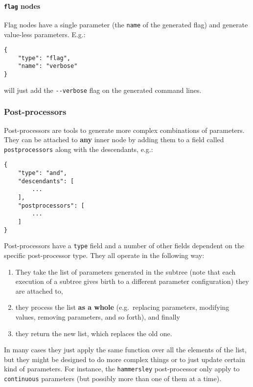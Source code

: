 \documentclass[11pt,notitlepage,twoside,a4paper]{article}
\begin{document}
\begin{footnotesize}
\paragraph{\texttt{flag} nodes}

Flag nodes have a single parameter (the \texttt{name} of the generated
flag) and generate value-less parameters. E.g.:

\begin{lstlisting}
{
    "type": "flag",
    "name": "verbose"
} 
\end{lstlisting}

\noindent
will just add the \texttt{-{}-verbose} flag on the generated command
lines.

\subsubsection{Post-processors}

Post-processors are tools to generate more complex combinations of
parameters. They can be attached to \textbf{any} inner node by adding
them to a field called \texttt{postprocessors} along with the
descendants, e.g.:

\begin{lstlisting}
{
    "type": "and",
    "descendants": [
        ...  
    ],
    "postprocessors": [
        ...
    ]
}
\end{lstlisting}

Post-processors have a \texttt{type} field and a number of other fields
dependent on the specific post-processor type. They all operate in the
following way:

\begin{enumerate}
\item
  They take the list of parameters generated in the subtree (note that
  each execution of a subtree gives birth to a different parameter
  configuration) they are attached to,
\item
  they process the list \textbf{as a whole} (e.g.~replacing parameters,
  modifying values, removing parameters, and so forth), and finally
\item
  they return the new list, which replaces the old one.
\end{enumerate}

In many cases they just apply the same function over all the elements of
the list, but they might be designed to do more complex things or to
just update certain kind of parameters. For instance, the
\texttt{hammersley} post-processor only apply to \texttt{continuous}
parameters (but possibly more than one of them at a time).


\end{footnotesize}
\end{document}
